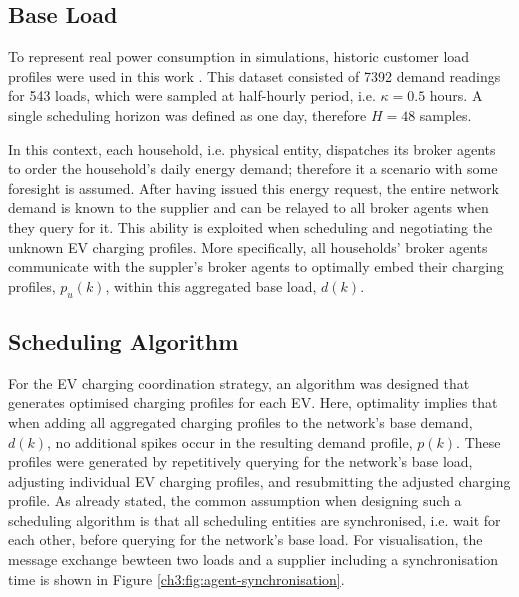 \subsection{Base Load}

To represent real power consumption in simulations, historic customer load profiles were used in this work \cite{IrishData2002}.
This dataset consisted of 7392 demand readings for 543 loads, which were sampled at half-hourly period, i.e. $\kappa = 0.5$ hours.
A single scheduling horizon was defined as one day, therefore $H=48$ samples.

In this context, each household, i.e. physical entity, dispatches its broker agents to order the household's daily energy demand; therefore it a scenario with some foresight is assumed.
After having issued this energy request, the entire network demand is known to the supplier and can be relayed to all broker agents when they query for it.
This ability is exploited when scheduling and negotiating the unknown EV charging profiles.
More specifically, all households' broker agents communicate with the suppler's broker agents to optimally embed their charging profiles, $p_u(k)$, within this aggregated base load, $d(k)$.

\subsection{Scheduling Algorithm}

For the EV charging coordination strategy, an algorithm was designed that generates optimised charging profiles for each EV.
Here, optimality implies that when adding all aggregated charging profiles to the network's base demand, $d(k)$, no additional spikes occur in the resulting demand profile, $p(k)$.
These profiles were generated by repetitively querying for the network's base load, adjusting individual EV charging profiles, and resubmitting the adjusted charging profile.
As already stated, the common assumption when designing such a scheduling algorithm is that all scheduling entities are synchronised, i.e. wait for each other, before querying for the network's base load.
For visualisation, the message exchange bewteen two loads and a supplier including a synchronisation time is shown in Figure \ref{ch3:fig:agent-synchronisation}.



